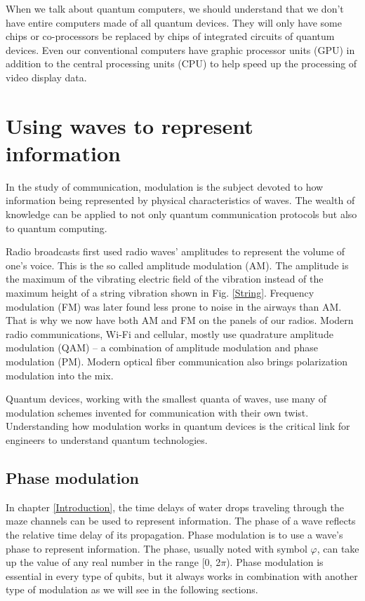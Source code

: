 \documentclass[Letter,11pt]{book}
\begin{document}
When we talk about quantum computers, we should understand that we don't have entire computers made of all quantum devices. They will only have some chips or co-processors be replaced by chips of integrated circuits of quantum devices. Even our conventional computers have graphic processor units (GPU) in addition to the central processing units (CPU) to help speed up the processing of video display data.

\chapter{Using waves to represent information}

In the study of communication, modulation is the subject devoted to how information being represented by physical characteristics of waves. The wealth of knowledge can be applied to not only quantum communication protocols but also to quantum computing.

Radio broadcasts first used radio waves' amplitudes to represent the volume of one's voice. This is the so called amplitude modulation (AM). The amplitude is the maximum of the vibrating electric field of the vibration instead of the maximum height of a string vibration shown in Fig. \ref{String}. Frequency modulation (FM) was later found less prone to noise in the airways than AM. That is why we now have both AM and FM on the panels of our radios. Modern radio communications, Wi-Fi and cellular, mostly use quadrature amplitude modulation (QAM) -- a combination of amplitude modulation and phase modulation (PM). Modern optical fiber communication also brings polarization modulation into the mix.

Quantum devices, working with the smallest quanta of waves, use many of modulation schemes invented for communication with their own twist. Understanding how modulation works in quantum devices is the critical link for engineers to understand quantum technologies.

\section{Phase modulation}
In chapter \ref{Introduction}, the time delays of water drops traveling through the maze channels can be used to represent information. The phase of a wave reflects the relative time delay of its propagation. Phase modulation is to use a wave's phase to represent information. The phase, usually noted with symbol $\varphi$, can take up the value of any real number in the range [0, 2$\pi$). Phase modulation is essential in every type of qubits, but it always works in combination with another type of modulation as we will see in the following sections.
\end{document}
